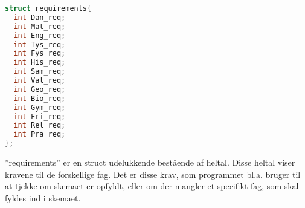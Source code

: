 \begin{lstlisting}[language = C]
struct requirements{
  int Dan_req;
  int Mat_req;
  int Eng_req;
  int Tys_req;
  int Fys_req;
  int His_req;
  int Sam_req;
  int Val_req;
  int Geo_req;
  int Bio_req;
  int Gym_req;
  int Fri_req;
  int Rel_req;
  int Pra_req;
};
\end{lstlisting}

”requirements” er en struct udelukkende bestående af heltal. Disse heltal viser kravene til de forskellige fag. Det er disse krav, som programmet bl.a. bruger til at tjekke om skemaet er opfyldt, eller om der mangler et specifikt fag, som skal fyldes ind i skemaet.
